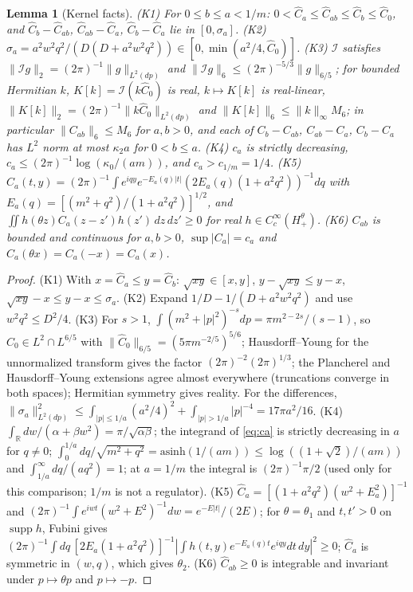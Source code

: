 \documentclass[11pt]{article}
\theoremstyle{plain}
\newtheorem{lemma}[theorem]{Lemma}
\theoremstyle{definition}
\theoremstyle{remark}
\newcommand{\R}{\mathbb{R}}
\newcommand{\cI}{\mathcal{I}}
\DeclareMathOperator{\supp}{supp}
\begin{document}
\begin{lemma}[Kernel facts]\label{lem:W-kernels}
(K1) For $0\le b\le a<1/m$: $0<\hat C_a\le\hat C_{ab}\le\hat C_b\le\hat C_0$, and $\hat C_b-\hat C_{ab}$,
$\hat C_{ab}-\hat C_a$, $\hat C_b-\hat C_a$ lie in $[0,\sigma_a]$. (K2) $\sigma_a=a^{2}w^{2}q^{2}/(D(D+a^{2}w^{2}q^{2}))\in[0,\min(a^{2}/4,\hat C_0)]$.
(K3) $\cI$ satisfies $\|\cI g\|_2=(2\pi)^{-1}\|g\|_{L^{2}(dp)}$ and $\|\cI g\|_6\le(2\pi)^{-5/3}\|g\|_{6/5}$; for bounded
Hermitian $k$, $K[k]=\cI(k\hat C_0)$ is real, $k\mapsto K[k]$ is real-linear,
$\|K[k]\|_2=(2\pi)^{-1}\|k\hat C_0\|_{L^{2}(dp)}$ and $\|K[k]\|_6\le\|k\|_\infty M_6$; in particular $\|C_{ab}\|_6\le M_6$ for
$a,b>0$, and each of $C_b-C_{ab}$, $C_{ab}-C_a$, $C_b-C_a$ has $L^{2}$ norm at most $\kappa_2a$ for
$0<b\le a$. (K4) $c_a$ is strictly decreasing, $c_a\le(2\pi)^{-1}\log(\kappa_0/(am))$, and $c_a>c_{1/m}=1/4$.
(K5) $C_a(t,y)=(2\pi)^{-1}\int e^{iqy}e^{-E_a(q)|t|}(2E_a(q)(1+a^{2}q^{2}))^{-1}dq$ with
$E_a(q)=[(m^{2}+q^{2})/(1+a^{2}q^{2})]^{1/2}$, and $\iint h(\theta z)C_a(z-z')h(z')\,dz\,dz'\ge0$ for real
$h\in C_c^{\infty}(H^{\theta}_{+})$. (K6) $C_{ab}$ is bounded and continuous for $a,b>0$,
$\sup|C_a|=c_a$ and $C_a(\theta x)=C_a(-x)=C_a(x)$.
\end{lemma}

\begin{proof}
(K1) With $x=\hat C_a\le y=\hat C_b$: $\sqrt{xy}\in[x,y]$, $y-\sqrt{xy}\le y-x$, $\sqrt{xy}-x\le y-x\le\sigma_a$.
(K2) Expand $1/D-1/(D+a^{2}w^{2}q^{2})$ and use $w^{2}q^{2}\le D^{2}/4$. (K3) For $s>1$,
$\int(m^{2}+|p|^{2})^{-s}dp=\pi m^{2-2s}/(s-1)$, so $\hat C_0\in L^{2}\cap L^{6/5}$ with
$\|\hat C_0\|_{6/5}=(5\pi m^{-2/5})^{5/6}$; Hausdorff--Young for the unnormalized transform gives the
factor $(2\pi)^{-2}(2\pi)^{1/3}$; the Plancherel and Hausdorff--Young extensions agree almost
everywhere (truncations converge in both spaces); Hermitian symmetry gives
reality. For the differences, $\|\sigma_a\|^{2}_{L^{2}(dp)}\le\int_{|p|\le1/a}(a^{2}/4)^{2}+\int_{|p|>1/a}|p|^{-4}=17\pi a^{2}/16$.
(K4) $\int_\R dw/(\alpha+\beta w^{2})=\pi/\sqrt{\alpha\beta}$; the integrand of \eqref{eq:ca} is strictly decreasing in
$a$ for $q\ne0$; $\int_0^{1/a}dq/\sqrt{m^{2}+q^{2}}=\mathrm{asinh}(1/(am))\le\log((1+\sqrt2)/(am))$ and
$\int_{1/a}^{\infty}dq/(aq^{2})=1$; at $a=1/m$ the integral is $(2\pi)^{-1}\pi/2$ (used only for this
comparison; $1/m$ is not a regulator). (K5) $\hat C_a=[(1+a^{2}q^{2})(w^{2}+E_a^{2})]^{-1}$ and
$(2\pi)^{-1}\int e^{iwt}(w^{2}+E^{2})^{-1}dw=e^{-E|t|}/(2E)$; for $\theta=\theta_1$ and $t,t'>0$ on $\supp h$, Fubini
gives $(2\pi)^{-1}\int dq\,[2E_a(1+a^{2}q^{2})]^{-1}|\int h(t,y)e^{-E_a(q)t}e^{iqy}dt\,dy|^{2}\ge0$; $\hat C_a$ is symmetric in
$(w,q)$, which gives $\theta_2$. (K6) $\hat C_{ab}\ge0$ is integrable and invariant under $p\mapsto\theta p$ and
$p\mapsto-p$.
\end{proof}
\end{document}
